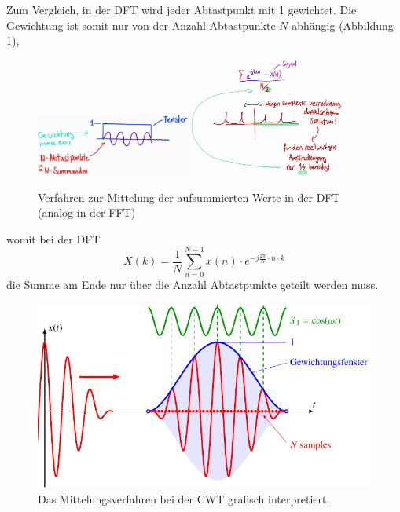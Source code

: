 Zum Vergleich, in der DFT wird jeder Abtastpunkt mit 1 gewichtet.
Die Gewichtung ist somit nur von der Anzahl Abtastpunkte $N$ abhängig
(Abbildung \ref{wavelet:fig:AmpSklal1u2}),
\begin{figure}
	\centering
	\includegraphics[width=0.45\textwidth]{papers/wavelets/images/11-1_AmpSklal1.png}
	\includegraphics[width=0.45\textwidth]{papers/wavelets/images/11-2_AmpSklal2.png}
	\caption{Verfahren zur Mittelung der aufsummierten Werte
	in der DFT (analog in der FFT)}
	\label{wavelet:fig:AmpSklal1u2}
\end{figure}
womit bei der DFT \[X(k)=\frac{1}{N}\sum_{n=0}^{N-1}x(n)\cdot e^{-j\frac{2\pi}{N}\cdot n \cdot k}\] die Summe am Ende nur über die Anzahl Abtastpunkte geteilt werden muss.

\begin{figure}
	\centering
	\includegraphics{papers/wavelets/images/mittelung.pdf}
	\caption{Das Mittelungsverfahren bei der CWT grafisch interpretiert.}
	\label{wavelet:fig:AmpSklal3}
\end{figure}

